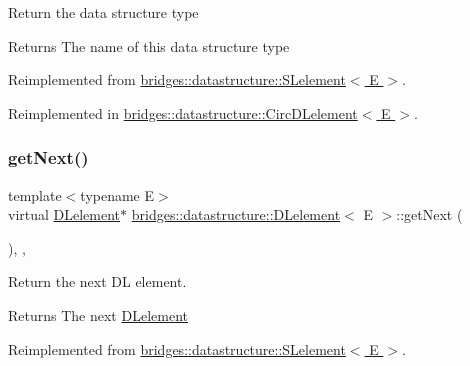 Return the data structure type

\begin{DoxyReturn}{Returns}
The name of this data structure type 
\end{DoxyReturn}


Reimplemented from \hyperlink{classbridges_1_1datastructure_1_1_s_lelement_a602156aacacd73d1faa365d68d8af31b}{bridges\+::datastructure\+::\+S\+Lelement$<$ E $>$}.



Reimplemented in \hyperlink{classbridges_1_1datastructure_1_1_circ_d_lelement_aec7f9b9dc6626c1a872feb91cd65425d}{bridges\+::datastructure\+::\+Circ\+D\+Lelement$<$ E $>$}.

\mbox{\label{classbridges_1_1datastructure_1_1_d_lelement_a63212051ea77d74bd751dea00288d2be}} 
\subsubsection{\texorpdfstring{get\+Next()}{getNext()}\hspace{0.1cm}{\footnotesize\ttfamily [1/2]}}
{\footnotesize\ttfamily template$<$typename E$>$ \\
virtual \hyperlink{classbridges_1_1datastructure_1_1_d_lelement}{D\+Lelement}$\ast$ \hyperlink{classbridges_1_1datastructure_1_1_d_lelement}{bridges\+::datastructure\+::\+D\+Lelement}$<$ E $>$\+::get\+Next (\begin{DoxyParamCaption}{ }\end{DoxyParamCaption})\hspace{0.3cm}{\ttfamily [inline]}, {\ttfamily [override]}, {\ttfamily [virtual]}}

Return the next DL element.

\begin{DoxyReturn}{Returns}
The next \hyperlink{classbridges_1_1datastructure_1_1_d_lelement}{D\+Lelement} 
\end{DoxyReturn}


Reimplemented from \hyperlink{classbridges_1_1datastructure_1_1_s_lelement_ae43dd771d9ced7cb17f1d35f34cd9a42}{bridges\+::datastructure\+::\+S\+Lelement$<$ E $>$}.



